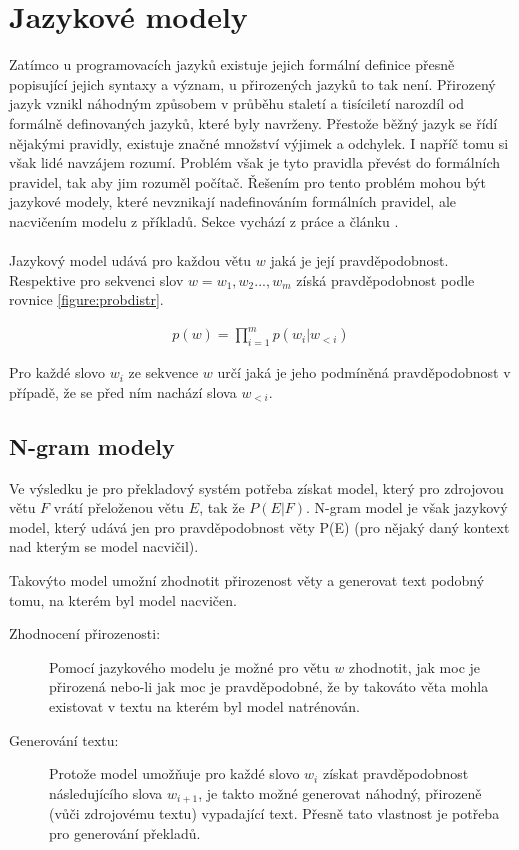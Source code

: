 \section{Jazykové modely}\label{section:langmodel}
Zatímco u programovacích jazyků existuje jejich formální definice přesně popisující jejich syntaxy a význam, u přirozených jazyků to tak není. Přirozený jazyk vznikl náhodným způsobem v průběhu staletí a tisíciletí narozdíl od formálně definovaných jazyků, které byly navrženy. Přestože běžný jazyk se řídí nějakými pravidly, existuje značné množství výjimek a odchylek. I napříč tomu si však lidé navzájem rozumí. Problém však je tyto pravidla převést do formálních pravidel, tak aby jim rozuměl počítač. Řešením pro tento problém mohou být jazykové modely, které nevznikají nadefinováním formálních pravidel, ale nacvičením modelu z příkladů. Sekce vychází z práce \cite{nmtThesis} a článku \cite{nmtTutorial}.
\\\\
Jazykový model udává pro každou větu $w$ jaká je její pravděpodobnost. Respektive pro sekvenci slov $w = w_1, w_2..., w_m$ získá pravděpodobnost podle rovnice \ref{figure:probdistr}.

\begin{align}\label{figure:probdistr}
  p(w) = \prod_{i=1}^{m} p(w_i|w_{<i})
\end{align}

Pro každé slovo $w_i$ ze sekvence $w$ určí jaká je jeho podmíněná pravděpodobnost v případě, že se před ním nachází slova $w_{<i}$.

\subsection{N-gram modely}\label{subsection:ngram}
Ve výsledku je pro překladový systém potřeba získat model, který pro zdrojovou větu $F$ vrátí přeloženou větu $E$, tak že $P(E|F)$. N-gram model je však jazykový model, který udává jen pro pravděpodobnost věty P(E) (pro nějaký daný kontext nad kterým se model nacvičil).

Takovýto model umožní zhodnotit přirozenost věty a generovat text podobný tomu, na kterém byl model nacvičen.

\begin{description}
  \item[Zhodnocení přirozenosti:] Pomocí jazykového modelu je možné pro větu $w$ zhodnotit, jak moc je přirozená nebo-li jak moc je pravděpodobné, že by takováto věta mohla existovat v textu na kterém byl model natrénován.
  \item[Generování textu:] Protože model umožňuje pro každé slovo $w_i$ získat pravděpodobnost následujícího slova $w_{i+1}$, je takto možné generovat náhodný, přirozeně (vůči zdrojovému textu) vypadající text. Přesně tato vlastnost je potřeba pro generování překladů.
\end{description}

